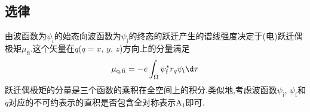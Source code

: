 \documentclass{ctexbook}
\begin{document}
\subsection{选律}
由波函数为$\psi_{\text{i}}$的始态向波函数为$\psi_{\text{f}}$的终态的跃迁产生的谱线强度决定于(电)跃迁偶极矩$\mu_{\text{fi}}$.这个矢量在$q$($q=x$, $y$, $z$)方向上的分量满足
\[\mu_{\text{q},\text{fi}}=-e\int_{\Omega}\psi_{\text{f}}^*r_q\psi_{\text{i}}\d\tau\]
跃迁偶极矩的分量是三个函数的乘积在全空间上的积分.类似地,考虑波函数$\psi_{\text{i}}$, $\psi_{\text{f}}$和$q$对应的不可约表示的直积是否包含全对称表示$\text{A}_1$即可.
\end{document}

